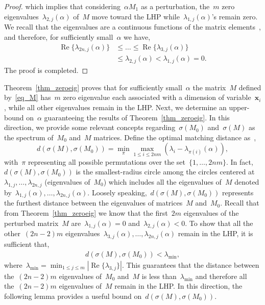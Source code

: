 \documentclass[letterpaper, 10pt, conference]{ieeeconf}
\def\mb{\mathbf}
\begin{document}
\begin{proof}
    which implies that considering~$\alpha M_1$ as a perturbation, the~$m$ zero eigenvalues~$\lambda_{2,j}(\alpha)$ of~$M$ move toward the LHP while~$\lambda_{1,j}(\alpha)$'s remain zero. We recall that the eigenvalues are a continuous functions of the matrix elements~\cite{stewart1990matrix}, and therefore, for sufficiently small~$\alpha$ we have,    
    \begin{equation}
    \begin{aligned}
         \operatorname{Re}\{\lambda_{2n,j}(\alpha)\} &\leq \ldots \leq \operatorname{Re}\{\lambda_{3,j}(\alpha)\} \\
        &\leq \lambda_{2,j}(\alpha) < \lambda_{1,j}(\alpha) = 0.
    \end{aligned}  
    \end{equation}
The proof is completed.
\end{proof}
Theorem~\ref{thm_zeroeig} proves that for sufficiently small~$\alpha$ the matrix~$M$ defined by~\eqref{eq_M} has~$m$ zero eigenvalue each associated with a dimension of variable~$\mb{x}_i$,  while all other eigenvalues remain in the LHP. Next, we determine an  upper-bound on~$\alpha$ guaranteeing  the results of Theorem~\ref{thm_zeroeig}. In this direction,  we provide some relevant concepts regarding~$\sigma(M_0)$ and~$\sigma(M)$ as the spectrum of~$M_0$ and~$M$ matrices. Define the optimal matching distance as~\cite{bhatia2013matrix}, \[d(\sigma(M),\sigma(M_0)) = \min_{\pi} \max_{1\leq i\leq 2nm} (\lambda_i - \lambda_{\pi(i)}(\alpha)),
\]
with~$\pi$ representing all possible permutations over the set~$\{1,\ldots,2nm\}$. In fact,~$d(\sigma(M),\sigma(M_0))$ is the smallest-radius circle among the circles centered at~$\lambda_{1,j},\ldots,\lambda_{2n,j}$ (eigenvalues of~$M_0$) which includes all the eigenvalues of~$M$ denoted by~$\lambda_{1,j}(\alpha),\ldots,\lambda_{2n,j}(\alpha)$. Loosely speaking,~$d(\sigma(M),\sigma(M_0))$ represents the furthest distance between the eigenvalues of matrices~$M$ and~$M_0$. Recall that from Theorem~\ref{thm_zeroeig} we know that the first~$2m$ eigenvalues of the perturbed matrix~$M$ are~$\lambda_{1,j}(\alpha)=0$ and~$\lambda_{2,j}(\alpha)<0$. To show that all the other~$(2n-2)m$ eigenvalues~$\lambda_{3,j}(\alpha),\ldots,\lambda_{2n,j}(\alpha)$ remain in the LHP, it is sufficient  that,
\begin{eqnarray} \label{eq_lambda3}
	d(\sigma(M),\sigma(M_0))<\lambda_{\min},
\end{eqnarray}
where~$\lambda_{\min}=\min_{1\leq j\leq m}|\operatorname{Re}\{\lambda_{3,j}\}|$. This guarantees that the distance between the~$(2n-2)m$ eigenvalues of~$M_0$ and~$M$ is less than~$\lambda_{\min}$ and therefore all the~$(2n-2)m$ eigenvalues of~$M$ remain in the LHP. In this direction, the following lemma provides a useful bound on~$d(\sigma(M),\sigma(M_0))$. 
\end{document}
